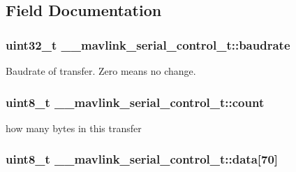 \subsection{Field Documentation}
\hypertarget{struct____mavlink__serial__control__t_a7daa8940caf4f90197d312dcc3714786}{
\subsubsection[{baudrate}]{\setlength{\rightskip}{0pt plus 5cm}uint32\+\_\+t \+\_\+\+\_\+mavlink\+\_\+serial\+\_\+control\+\_\+t\+::baudrate}}\label{struct____mavlink__serial__control__t_a7daa8940caf4f90197d312dcc3714786}


Baudrate of transfer. Zero means no change. 

\hypertarget{struct____mavlink__serial__control__t_acf50603676367ad8b697cf49f7b7a02b}{
\subsubsection[{count}]{\setlength{\rightskip}{0pt plus 5cm}uint8\+\_\+t \+\_\+\+\_\+mavlink\+\_\+serial\+\_\+control\+\_\+t\+::count}}\label{struct____mavlink__serial__control__t_acf50603676367ad8b697cf49f7b7a02b}


how many bytes in this transfer 

\hypertarget{struct____mavlink__serial__control__t_a44023fc3066b5851820a1a69681e5615}{
\subsubsection[{data}]{\setlength{\rightskip}{0pt plus 5cm}uint8\+\_\+t \+\_\+\+\_\+mavlink\+\_\+serial\+\_\+control\+\_\+t\+::data\mbox{[}70\mbox{]}}}\label{struct____mavlink__serial__control__t_a44023fc3066b5851820a1a69681e5615}


